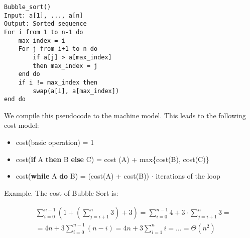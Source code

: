 \begin{algorithm}
\begin{lstlisting}
Bubble_sort()
Input: a[1], ..., a[n]
Output: Sorted sequence
For i from 1 to n-1 do
    max_index = i
    For j from i+1 to n do
        if a[j] > a[max_index]
        then max_index = j
    end do
    if i != max_index then
        swap(a[i], a[max_index])
end do
\end{lstlisting}
\end{algorithm}

We compile this pseudocode to the machine model. This leads to the following cost model:

\begin{itemize}
\item cost(basic operation) = 1
\item cost(\textbf{if} A \textbf{then} B \textbf{else} C) = cost (A) + max\{cost(B), cost(C)\}
\item cost(\textbf{while} A \textbf{do} B) = (cost(A) + cost(B)) $\cdot$ iterations of the loop
\end{itemize}

Example. The cost of Bubble Sort is:

\begin{align*}
&\sum\limits_{i=0}^{n-1} (1 + (\sum\limits_{j=i+1}^n 3) + 3) = \sum\limits_{i=0}^{n-1} 4 + 3 \cdot \sum\limits_{j=i+1}^n 3 = \\
&= 4n + 3 \sum\limits_{i=0}^{n-1} (n-i) = 4n + 3 \sum\limits_{i=1}^{n} i = \ldots = \Theta(n^2) \\
\end{align*}
